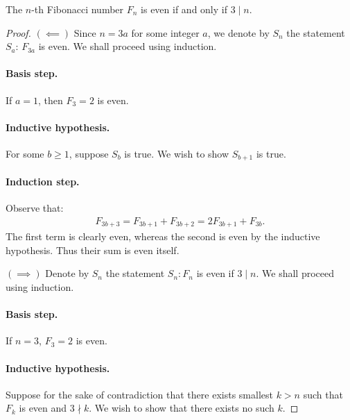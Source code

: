 \documentclass{exam}
\begin{document}
\begin{proposition}{10.42}
    The $n$-th Fibonacci number $F_n$ is even if and only if $3\mid n$.
\end{proposition}

\begin{proof}
    $(\impliedby)$ Since $n=3a$ for some integer $a$, we denote by $S_n$ the statement $S_a$: $F_{3a}$ is even. We shall proceed using induction.

    \paragraph{Basis step.} If $a=1$, then $F_3 = 2$ is even.

    \paragraph{Inductive hypothesis.} For some $b\ge1$, suppose $S_b$ is true. We wish to show $S_{b+1}$ is true.

    \paragraph{Induction step.} Observe that:
    \begin{align*}
        F_{3b + 3} = F_{3b+1}+F_{3b + 2} = 2F_{3b+1} + F_{3b}.
    \end{align*}
    The first term is clearly even, whereas the second is even by the inductive hypothesis. Thus their sum is even itself.

    $(\implies)$ Denote by $S_n$ the statement $S_n: F_n$ is even if $3\mid n$. We shall proceed using induction.

    \paragraph{Basis step.} If $n =3$, $F_3 = 2$ is even.

    \paragraph{Inductive hypothesis.} Suppose for the sake of contradiction that there exists smallest $k>n$ such that $F_k$ is even and $3\nmid k$. We wish to show that there exists no such $k$.


\end{proof}
\end{document}
